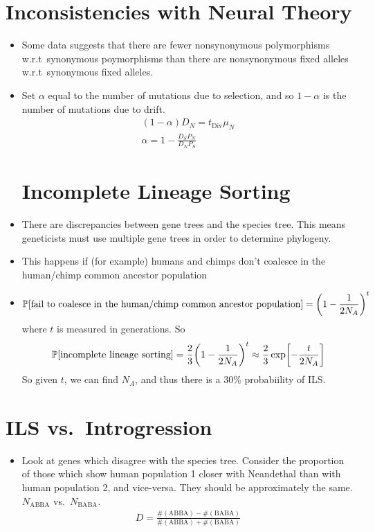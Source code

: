 \documentclass{article}
\newcommand{\prob}[1]{\mathbb{P}\qty[#1]}
\begin{document}
    \section{Inconsistencies with Neural Theory}
        \begin{itemize}
            \item Some data suggests that there are fewer nonsynonymous polymorphisms w.r.t~synonymous poymorphisms than there are nonsynonymous fixed alleles w.r.t~synonymous fixed alleles.
            \item Set $\alpha$ equal to the number of mutations due to selection, and so $1 - \alpha$ is the number of mutations due to drift.
            \begin{align*}
                (1 - \alpha)D_N = t_\text{Div}\mu_N \\
                \alpha = 1 - \frac{D_SP_N}{D_NP_S}
            \end{align*}
    \section{Incomplete Lineage Sorting}
            \item There are discrepancies between gene trees and the species tree.  This means geneticists must use multiple gene trees in order to determine phylogeny.
            \item This happens if (for example) humans and chimps don't coalesce in the human/chimp common ancestor population
            \item 
            \begin{align*}
                \prob{\text{fail to coalesce in the human/chimp common ancestor population}} = \qty(1 - \frac{1}{2N_A})^t
            \end{align*}
            where $t$ is measured in generations.  So
            \begin{align*}
                \prob{\text{incomplete lineage sorting}} = \frac{2}{3}\qty(1 - \frac{1}{2N_A})^t \approx \frac{2}{3}\exp[-\frac{t}{2N_A}]
            \end{align*}
            So given $t$, we can find $N_A$, and thus there is a $30\%$ probabiility of ILS.
        \end{itemize}

    \section{ILS vs.~Introgression}
        \begin{itemize}
            \item Look at genes which disagree with the species tree.  Consider the proportion of those which show human population 1 closer with Neandethal than with human population 2, and vice-versa.  They should be approximately the same. $N_{\text{ABBA}}$ vs.~$N_{\text{BABA}}$.
            \begin{align*}
                D = \frac{\#(\text{ABBA}) - \#(\text{BABA})}{\#(\text{ABBA}) + \#(\text{BABA})}
            \end{align*}
        \end{itemize}
\end{document}
